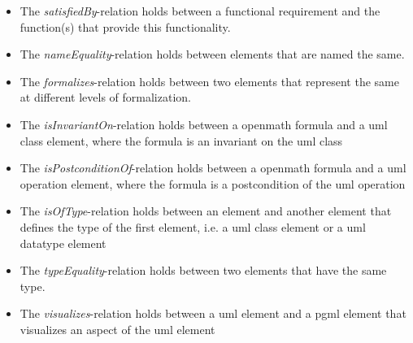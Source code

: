 \documentclass[pdftex,a4paper]{article}
\begin{document}
\begin{itemize}
\item The \textit{satisfiedBy}-relation holds between a functional requirement and the
    function(s) that provide this functionality.
\item The \textit{nameEquality}-relation holds between elements that are named the same.
\item The \textit{formalizes}-relation holds between two elements that represent the same at
    different levels of formalization.
\item The \textit{isInvariantOn}-relation holds between a openmath formula and a uml class
    element, where the formula is an invariant on the uml class
\item The \textit{isPostconditionOf}-relation holds between a openmath formula and a uml
    operation element, where the formula is a postcondition of the uml operation
\item The \textit{isOfType}-relation holds between an element and another element that defines
    the type of the first element, i.e. a uml class element or a uml datatype element
\item The \textit{typeEquality}-relation holds between two elements that have the same type.
\item The \textit{visualizes}-relation holds between a uml element and a pgml element that
    visualizes an aspect of the uml element
\end{itemize}
\end{document}
